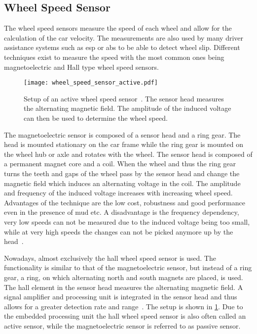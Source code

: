 \subsection{Wheel Speed Sensor}
The wheel speed sensors measure the speed of each wheel and allow for the calculation of the car velocity.
The measurements are also used by many driver assistance systems such as \gls{esp} or \gls{abs} to be able to detect wheel slip.
Different techniques exist to measure the speed with the most common ones being magnetoelectric and Hall type wheel speed sensors.\par
\begin{figure}[htb]
    \centering
    \texttt{[image: wheel\_speed\_sensor\_active.pdf]}
    \caption[Setup of an active wheel speed sensor]{Setup of an active wheel speed sensor~\cite{Re2011}. The sensor head measures the alternating magnetic field. The amplitude of the induced voltage can then be used to determine the wheel speed.}
    \label{fig:wheel_speed_sensor_active}
\end{figure}
The magnetoelectric sensor is composed of a sensor head and a ring gear.
The head is mounted stationary on the car frame while the ring gear is mounted on the wheel hub or axle and rotates with the wheel.
The sensor head is composed of a permanent magnet core and a coil.
When the wheel and thus the ring gear turns the teeth and gaps of the wheel pass by the sensor head and change the magnetic field which induces an alternating voltage in the coil.
The amplitude and frequency of the induced voltage increases with increasing wheel speed.
Advantages of the technique are the low cost, robustness and good performance even in the presence of mud etc.
A disadvantage is the frequency dependency, very low speeds can not be measured due to the induced voltage being too small, while at very high speeds the changes can not be picked anymore up by the head~\cite{AutoReif2014}.\par
Nowadays, almost exclusively the hall wheel speed sensor is used.
The functionality is similar to that of the magnetoelectric sensor, but instead of a ring gear, a ring, on which alternating north and south magnets are placed, is used.
The hall element in the sensor head measures the alternating magnetic field.
A signal amplifier and processing unit is integrated in the sensor head and thus allows for a greater detection rate and range~\cite{Re2011}.
The setup is shown in \cref{fig:wheel_speed_sensor_active}.
Due to the embedded processing unit the hall wheel speed sensor is also often called an active sensor, while the magnetoelectric sensor is referred to as passive sensor.



